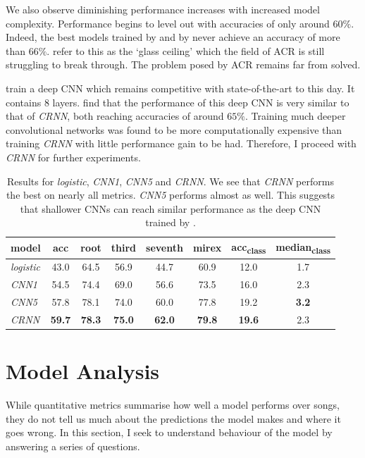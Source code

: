 We also observe diminishing performance increases with increased model complexity. Performance begins to level out with accuracies of only around $60\%$. Indeed, the best models trained by \citet{BTC} and by \citet{ChordFormer} never achieve an accuracy of more than $66\%$. \citet{FourTimelyInsights} refer to this as the `glass ceiling' which the field of ACR is still struggling to break through. The problem posed by ACR remains far from solved.

\citet{FeatureMaps} train a deep CNN which remains competitive with state-of-the-art to this day. It contains 8 layers. \citet{BTC} find that the performance of this deep CNN is very similar to that of \emph{CRNN}, both reaching accuracies of around $65\%$. Training much deeper convolutional networks was found to be more computationally expensive than training \emph{CRNN} with little performance gain to be had. Therefore, I proceed with \emph{CRNN} for further experiments.

\begin{table}[h]
    \centering
    \begin{tabular}{lccccccc}
        \toprule
        model & acc & root & third & seventh & mirex & acc\textsubscript{class} & median\textsubscript{class} \\  
        \midrule
        \emph{logistic} & 43.0 & 64.5 & 56.9 & 44.7 & 60.9 & 12.0 & 1.7 \\
        \emph{CNN1} & 54.5 & 74.4 & 69.0 & 56.6 & 73.5 & 16.0 & 2.3 \\
        \emph{CNN5} & 57.8 & 78.1 & 74.0 & 60.0 & 77.8 & 19.2 & \textbf{3.2} \\
        \emph{CRNN} & \textbf{59.7} & \textbf{78.3} & \textbf{75.0} & \textbf{62.0} & \textbf{79.8} & \textbf{19.6} & 2.3 \\
        \bottomrule
    \end{tabular}
    \caption{Results for \emph{logistic}, \emph{CNN1}, \emph{CNN5} and \emph{CRNN}. We see that \emph{CRNN} performs the best on nearly all metrics. \emph{CNN5} performs almost as well. This suggests that shallower CNNs can reach similar performance as the deep CNN trained by \citet{FeatureMaps}.}\label{tab:first_results}
\end{table}

\section{Model Analysis}\label{sec:crnn_analysis}

While quantitative metrics summarise how well a model performs over songs, they do not tell us much about the predictions the model makes and where it goes wrong. In this section, I seek to understand behaviour of the model by answering a series of questions.


